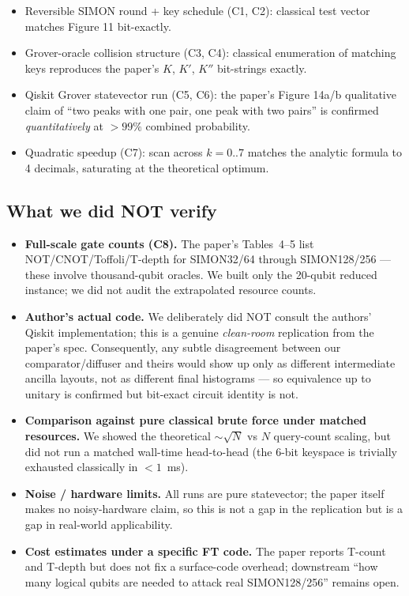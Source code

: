 \documentclass[11pt]{article}
\begin{document}
\begin{itemize}
  \item Reversible SIMON round + key schedule (C1, C2): classical test vector
    matches Figure 11 bit-exactly.
  \item Grover-oracle collision structure (C3, C4): classical enumeration of
    matching keys reproduces the paper's $K$, $K'$, $K''$ bit-strings exactly.
  \item Qiskit Grover statevector run (C5, C6): the paper's Figure 14a/b
    qualitative claim of ``two peaks with one pair, one peak with two pairs''
    is confirmed \emph{quantitatively} at $>99\%$ combined probability.
  \item Quadratic speedup (C7): scan across $k=0..7$ matches the analytic
    formula to 4 decimals, saturating at the theoretical optimum.
\end{itemize}

\subsection*{What we did NOT verify}

\begin{itemize}
  \item \textbf{Full-scale gate counts (C8).} The paper's Tables~4--5 list
    NOT/CNOT/Toffoli/T-depth for SIMON32/64 through SIMON128/256 --- these
    involve thousand-qubit oracles. We built only the 20-qubit reduced
    instance; we did not audit the extrapolated resource counts.
  \item \textbf{Author's actual code.} We deliberately did NOT consult the
    authors' Qiskit implementation; this is a genuine \emph{clean-room}
    replication from the paper's spec. Consequently, any subtle disagreement
    between our comparator/diffuser and theirs would show up only as different
    intermediate ancilla layouts, not as different final histograms --- so
    equivalence up to unitary is confirmed but bit-exact circuit identity is
    not.
  \item \textbf{Comparison against pure classical brute force under matched
    resources.} We showed the theoretical $\sim\sqrt{N}$ vs $N$ query-count
    scaling, but did not run a matched wall-time head-to-head (the 6-bit
    keyspace is trivially exhausted classically in $<1$~ms).
  \item \textbf{Noise / hardware limits.} All runs are pure statevector; the
    paper itself makes no noisy-hardware claim, so this is not a gap in the
    replication but is a gap in real-world applicability.
  \item \textbf{Cost estimates under a specific FT code.} The paper reports
    T-count and T-depth but does not fix a surface-code overhead; downstream
    ``how many logical qubits are needed to attack real SIMON128/256'' remains
    open.
\end{itemize}
\end{document}
